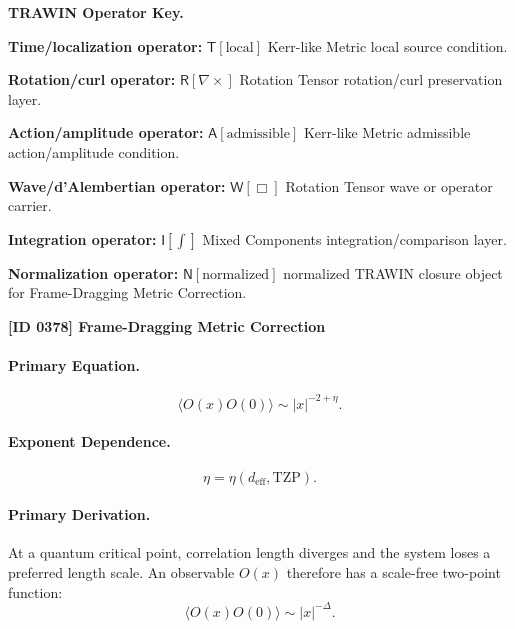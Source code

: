 \par\vspace{0.45\baselineskip}
\noindent\begin{minipage}[t]{\linewidth}
\begingroup
\small
\raggedright
\textbf{TRAWIN Operator Key.}\par
\noindent\textbf{Time/localization operator:} $\mathsf{T}\!\left[\mathrm{local}\right]$ Kerr-like Metric local source condition.\par
\noindent\textbf{Rotation/curl operator:} $\mathsf{R}\!\left[\nabla\times\right]$ Rotation Tensor rotation/curl preservation layer.\par
\noindent\textbf{Action/amplitude operator:} $\mathsf{A}\!\left[\mathrm{admissible}\right]$ Kerr-like Metric admissible action/amplitude condition.\par
\noindent\textbf{Wave/d'Alembertian operator:} $\mathsf{W}\!\left[\Box\right]$ Rotation Tensor wave or operator carrier.\par
\noindent\textbf{Integration operator:} $\mathsf{I}\!\left[\int\right]$ Mixed Components integration/comparison layer.\par
\noindent\textbf{Normalization operator:} $\mathsf{N}\!\left[\mathrm{normalized}\right]$ normalized TRAWIN closure object for Frame-Dragging Metric Correction.\par
\endgroup
\end{minipage}

\clearpage
\noindent\textbf{[ID 0378] Frame-Dragging Metric Correction}\par
\vspace{0.35em}
\paragraph{Primary Equation.}
\begin{equation}
\langle O(x)O(0)\rangle
\sim
|x|^{-2+\eta}.
\end{equation}

\paragraph{Exponent Dependence.}
\begin{equation}
\eta=\eta(d_{\mathrm{eff}},\mathrm{TZP}).
\end{equation}

\paragraph{Primary Derivation.}
At a quantum critical point, correlation length diverges and the system loses a preferred length scale.  
An observable $O(x)$ therefore has a scale-free two-point function:
\begin{equation}
\langle O(x)O(0)\rangle
\sim
|x|^{-\Delta}.
\end{equation}

